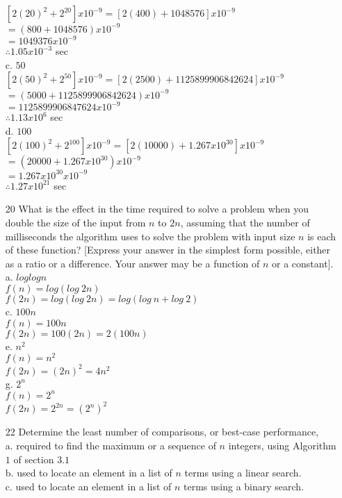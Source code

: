 \documentclass[a4paper]{article}
\newcommand\tab[1][0.5cm]{\hspace*{#1}}
\begin{document}
\begin{itemize}
      \tab $[2(20)^2 + 2^{20}] x 10^{-9} = [2(400) + 1048576] x 10^{-9}$ \\
      \tab\tab\tab $= (800 + 1048576) x 10^{-9}$ \\
      \tab\tab\tab $= 1049376 x 10^{-9}$ \\
      \tab\tab\tab $\therefore 1.05 x 10^{-3}$ sec \\
      c. $50$ \\
      \tab $[2(50)^2 + 2^{50}] x 10^{-9} = [2(2500) + 1125899906842624] x 10^{-9}$ \\
      \tab\tab\tab $= (5000 + 1125899906842624) x 10^{-9}$ \\
      \tab\tab\tab $= 1125899906847624 x 10^{-9}$ \\
      \tab\tab\tab $\therefore 1.13 x 10^{6}$ sec \\
      d. $100$ \\
      \tab $[2(100)^2 + 2^{100}] x 10^{-9} = [2(10000) + 1.267 x 10^{30}] x 10^{-9}$ \\
      \tab\tab\tab $= (20000 + 1.267 x 10^{30}) x 10^{-9}$ \\
      \tab\tab\tab $= 1.267 x 10^{30} x 10^{-9}$ \\
      \tab\tab\tab $\therefore 1.27 x 10^{21}$ sec
    \item[20] What is the effect in the time required to solve a problem when you double the size of the input from $n$ to $2n$, assuming that the number of milliseconds the algorithm uses to solve the problem with input size $n$ is each of these function? [Express your answer in the simplest form possible, either as a ratio or a difference. Your answer may be a function of $n$ or a constant]. \\
      a. $log log n$ \\
      \tab $f(n) = log(log\ 2n)$ \\
      \tab $f(2n) = log(log\ 2n) = log(log\ n + log\ 2)$ \\
      c. $100n$ \\
      \tab $f(n) = 100n$ \\
      \tab $f(2n) = 100(2n) = 2(100n)$ \\
      e. $n^{2}$ \\
      \tab $f(n) = n^{2}$ \\
      \tab $f(2n) = (2n)^{2} = 4n^{2}$ \\
      g. $2^{n}$ \\
      \tab $f(n) = 2^{n}$ \\
      \tab $f(2n) = 2^{2n} = (2^{n})^{2}$ 
    \item[22] Determine the least number of comparisons, or best-case performance, \\
      a. required to find the maximum or a sequence of $n$ integers, using Algorithm $1$ of section $3.1$ \\
      b. used to locate an element in a list of $n$ terms using a linear search. \\
      c. used to locate an element in a list of $n$ terms using a binary search.
  \end{itemize}
 

  
  
\end{document}
